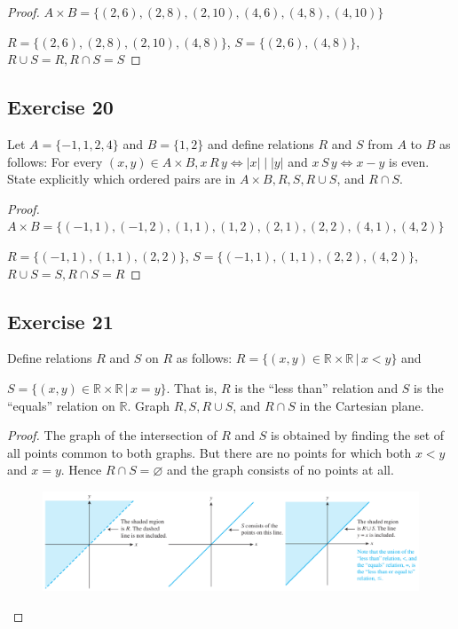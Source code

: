 \documentclass[14pt]{extarticle}
\newcommand{\es}{\varnothing}
\newcommand{\R}{\mathbb{R}}
\begin{document}
\begin{proof}
\(A \times B = \{(2, 6), (2, 8), (2, 10), (4, 6), (4, 8), (4, 10)\}\)

\(R = \{(2, 6), (2, 8), (2, 10), (4, 8)\}\), \(S = \{(2, 6), (4, 8)\}\), \(R \cup S = R, R \cap S = S\)
\end{proof}

\subsection{Exercise 20}
Let \(A = \{-1, 1, 2, 4\}\) and \(B = \{1, 2\}\) and define relations $R$ and $S$ from $A$ to $B$ as follows: For every 
\((x, y) \in A \times B, x \, R \, y \iff |x| \mid |y|\) and \(x \, S \, y \iff x - y\) is even. State explicitly 
which ordered pairs are in \(A \times B, R, S, R \cup S\), and \(R \cap S\).

\begin{proof}
\(A \times B = \{(-1, 1), (-1, 2), (1, 1), (1, 2), (2, 1), (2, 2), (4, 1), (4, 2)\}\)

\(R = \{(-1, 1), (1, 1), (2, 2)\}\), \(S = \{(-1, 1), (1, 1), (2, 2), (4, 2)\}\), \(R \cup S = S, R \cap S = R\)
\end{proof}

\subsection{Exercise 21}
Define relations $R$ and $S$ on $R$ as follows: \(R = \{(x, y) \in \R \times \R \, | \, x < y\}\) and 

\(S = \{(x, y) \in \R \times \R \, | \, x = y\}\). That is, $R$ is the “less than” relation and $S$ is the “equals” 
relation on $\R$. Graph \(R, S, R \cup S\), and \(R \cap S\) in the Cartesian plane.

\begin{proof}
The graph of the intersection of $R$ and $S$ is obtained by finding the set of all points common to both graphs. But 
there are no points for which both \(x < y\) and \(x = y\). Hence \(R \cap S = \es\) and the graph consists of no 
points at all.

\begin{figure}[ht!]
\centering
\includegraphics[scale=0.35]{../images/8.1.21.png}
\end{figure}
\end{proof}
\end{document}
